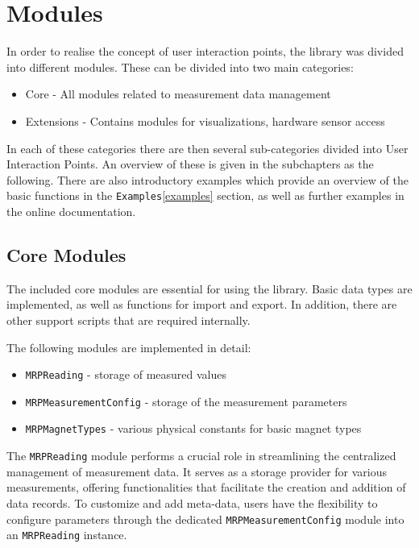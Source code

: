 \hypertarget{modules}{%
\section{Modules}\label{modules}}

In order to realise the concept of user interaction points, the library
was divided into different modules. These can be divided into two main
categories:

\begin{itemize}
\tightlist
\item
  Core - All modules related to measurement data management
\item
  Extensions - Contains modules for visualizations, hardware sensor
  access
\end{itemize}

In each of these categories there are then several sub-categories
divided into User Interaction Points. An overview of these is given in
the subchapters as the following. There are also introductory examples
which provide an overview of the basic functions in the
\passthrough{\lstinline!Examples!}\ref{examples} section, as well as
further examples in the online
documentation\cite{MagneticReadoutProcessingReadTheDocs}.

\hypertarget{core-modules}{%
\subsection{Core Modules}\label{core-modules}}

The included core modules are essential for using the library. Basic
data types are implemented, as well as functions for import and export.
In addition, there are other support scripts that are required
internally.

The following modules are implemented in detail:

\begin{itemize}
\tightlist
\item
  \passthrough{\lstinline!MRPReading!} - storage of measured values
\item
  \passthrough{\lstinline!MRPMeasurementConfig!} - storage of the
  measurement parameters
\item
  \passthrough{\lstinline!MRPMagnetTypes!} - various physical constants
  for basic magnet types
\end{itemize}

The \passthrough{\lstinline!MRPReading!} module performs a crucial role
in streamlining the centralized management of measurement data. It
serves as a storage provider for various measurements, offering
functionalities that facilitate the creation and addition of data
records. To customize and add meta-data, users have the flexibility to
configure parameters through the dedicated
\passthrough{\lstinline!MRPMeasurementConfig!} module into an
\passthrough{\lstinline!MRPReading!} instance.

